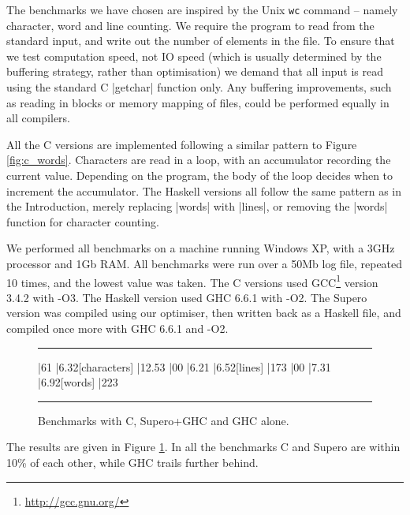 \documentclass{llncs}
\newenvironment{fig}
    {\begin{figure}[tbp]\hrule}
    {\end{figure}}
\newcommand{\figend}{\hrule}
\begin{document}
The benchmarks we have chosen are inspired by the Unix \texttt{wc} command -- namely character, word and line counting. We require the program to read from the standard input, and write out the number of elements in the file. To ensure that we test computation speed, not IO speed (which is usually determined by the buffering strategy, rather than optimisation) we demand that all input is read using the standard C |getchar| function only. Any buffering improvements, such as reading in blocks or memory mapping of files, could be performed equally in all compilers.

All the C versions are implemented following a similar pattern to Figure \ref{fig:c_words}. Characters are read in a loop, with an accumulator recording the current value. Depending on the program, the body of the loop decides when to increment the accumulator. The Haskell versions all follow the same pattern as in the Introduction, merely replacing |words| with |lines|, or removing the |words| function for character counting.

We performed all benchmarks on a machine running Windows XP, with a 3GHz processor and 1Gb RAM. All benchmarks were run over a 50Mb log file, repeated 10 times, and the lowest value was taken. The C versions used GCC\footnote{\url{http://gcc.gnu.org/}} version 3.4.2 with -O3. The Haskell version used GHC 6.6.1 with -O2. The Supero version was compiled using our optimiser, then written back as a Haskell file, and compiled once more with GHC 6.6.1 and -O2.

\begin{fig}
\vspace{7mm}
\begin{barenv}
 
\bar{6}{1}
\bar{6.3}{2}[characters]
\bar{12.5}{3}
\bar{0}{0}
\bar{6.2}{1}
\bar{6.5}{2}[lines]
\bar{17}{3}
\bar{0}{0}
\bar{7.3}{1}
\bar{6.9}{2}[words]
\bar{22}{3}
\end{barenv}
\vspace{7mm}
\figend
\caption{Benchmarks with C, Supero+GHC and GHC alone.}
\label{fig:c_results}
\end{fig}

The results are given in Figure \ref{fig:c_results}. In all the benchmarks C and Supero are within 10\% of each other, while GHC trails further behind.
\end{document}
